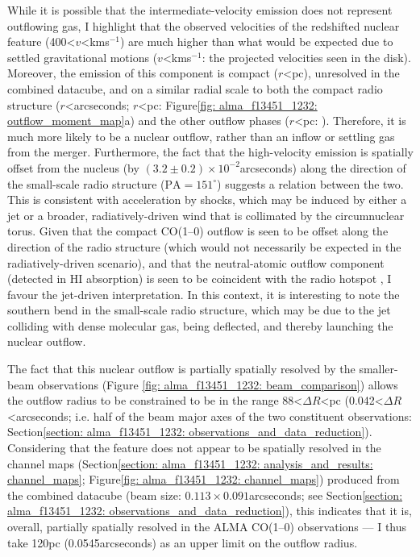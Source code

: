 While it is possible that the intermediate-velocity emission does not represent outflowing gas, I highlight that the observed velocities of the redshifted nuclear feature (400\;\textless\;$v$\;\textless{}\;km\;s$^{-1}$) are much higher than what would be expected due to settled gravitational motions ($v$\;\textless{}\;km\;s$^{-1}$: the projected velocities seen in the disk). Moreover, the emission of this component is compact ($r$\;\textless{}\;pc), unresolved in the combined datacube, and on a similar radial scale to both the compact radio structure ($r$\;\textless{}\;arcseconds; $r$\;\textless{}\;pc: Figure\;\ref{fig: alma_f13451_1232: outflow_moment_map}a) and the other outflow phases ($r$\;\textless{}\;pc: \citealt{Morganti2013_4c1250, Tadhunter2018}). Therefore, it is much more likely to be a nuclear outflow, rather than an inflow or settling gas from the merger. Furthermore, the fact that the high-velocity emission is spatially offset from the nucleus (by $(3.2\pm0.2)\times10^{-2}$\;arcseconds) along the direction of the small-scale radio structure ($\mathrm{PA}=151^\circ$) suggests a relation between the two. This is consistent with acceleration by shocks, which may be induced by either a jet or a broader, radiatively-driven wind that is collimated by the circumnuclear torus. Given that the compact CO(1--0) outflow is seen to be offset along the direction of the radio structure (which would not necessarily be expected in the radiatively-driven scenario), and that the neutral-atomic outflow component (detected in HI absorption) is seen to be coincident with the radio hotspot \citep{Morganti2013_4c1250}, I favour the jet-driven interpretation. In this context, it is interesting to note the southern bend in the small-scale radio structure, which may be due to the jet colliding with dense molecular gas, being deflected, and thereby launching the nuclear outflow.

The fact that this nuclear outflow is partially spatially resolved by the smaller-beam observations (Figure \ref{fig: alma_f13451_1232: beam_comparison}) allows the outflow radius to be constrained to be in the range 88\;\textless\;$\Delta{R}$\;\textless{}\;pc (0.042\;\textless\;$\Delta{R}$\;\textless{}\;arcseconds; i.e. half of the beam major axes of the two constituent observations: Section\;\ref{section: alma_f13451_1232: observations_and_data_reduction}). Considering that the feature does not appear to be spatially resolved in the channel maps (Section\;\ref{section: alma_f13451_1232: analysis_and_results: channel_maps}; Figure\;\ref{fig: alma_f13451_1232: channel_maps}) produced from the combined datacube (beam size: $0.113\times0.091$\;arcseconds; see Section\;\ref{section: alma_f13451_1232: observations_and_data_reduction}), this indicates that it is, overall, partially spatially resolved in the ALMA CO(1--0) observations --- I thus take 120\;pc (0.0545\;arcseconds) as an upper limit on the outflow radius.

